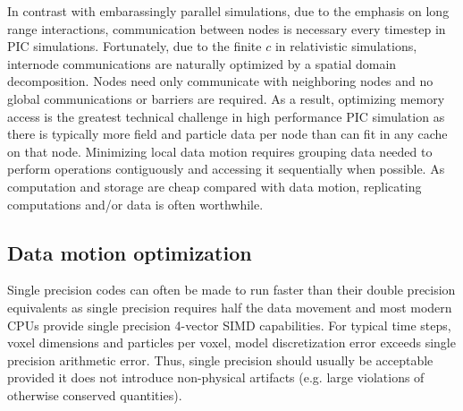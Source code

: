 \documentclass[journal,twoside]{IEEEtran}
\begin{document}
In contrast with embarassingly parallel simulations, due to the
emphasis on long range interactions, communication between nodes is
necessary every timestep in PIC simulations.  Fortunately, due to the
finite $c$ in relativistic simulations, internode communications are
naturally optimized by a spatial domain decomposition.  Nodes need
only communicate with neighboring nodes and no global communications
or barriers are required.  As a result, optimizing memory access is
the greatest technical challenge in high performance PIC simulation as
there is typically more field and particle data per node than can fit
in any cache on that node.  Minimizing local data motion requires
grouping data needed to perform operations contiguously and accessing
it sequentially when possible.  As computation and storage are cheap
compared with data motion, replicating computations and/or data is
often worthwhile.

\subsection{Data motion optimization}

Single precision codes can often be made to run faster than their
double precision equivalents as single precision requires half the
data movement and most modern CPUs provide single precision 4-vector
SIMD capabilities.  For typical time steps, voxel dimensions and
particles per voxel, model discretization error exceeds single
precision arithmetic error.  Thus, single precision should usually be
acceptable provided it does not introduce non-physical artifacts
(e.g. large violations of otherwise conserved quantities).
\end{document}
